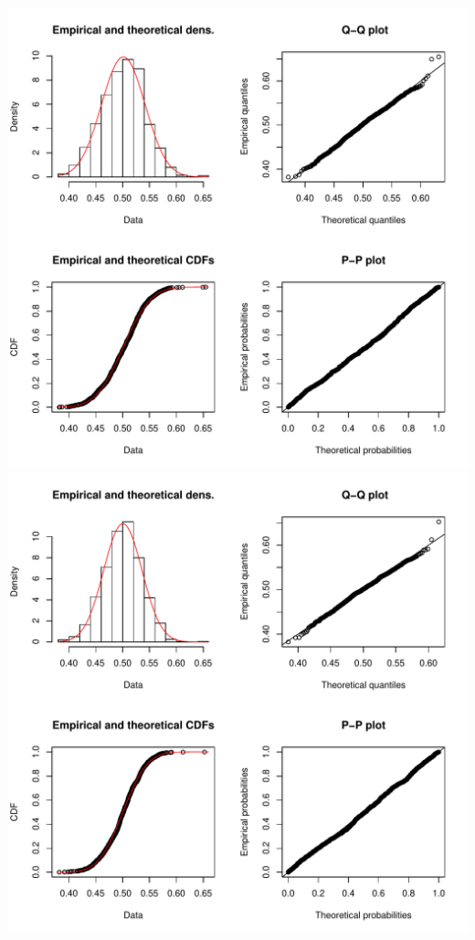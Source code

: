 \documentclass[]{article}
\begin{document}
\includegraphics{2016_w09_files/figure-latex/unnamed-chunk-9-10.pdf}
\includegraphics{2016_w09_files/figure-latex/unnamed-chunk-9-11.pdf}
\end{document}
